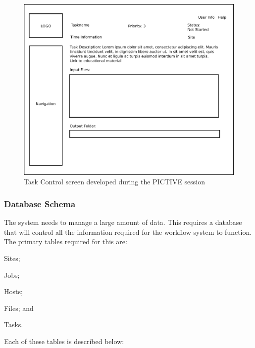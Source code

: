 \begin{figure}[!h]
    \begin{center}
        \includegraphics[scale=0.25]{figures/task_overview.pdf}
    \end{center}
    \caption{Task Control screen developed during the PICTIVE session}
    \label{pictive_task}
\end{figure}

\subsubsection{Database Schema\label{db_schema}}
The system needs to manage a large amount of data. This requires
a database that will control all the information required for the
workflow system to function. The primary tables required for this are:
\begin{inparaenum}[(i)]
\item Sites;
\item Jobs;
\item Hosts;
\item Files; and
\item Tasks.
\end{inparaenum}

\noindent Each of these tables is described below:
\newpage

